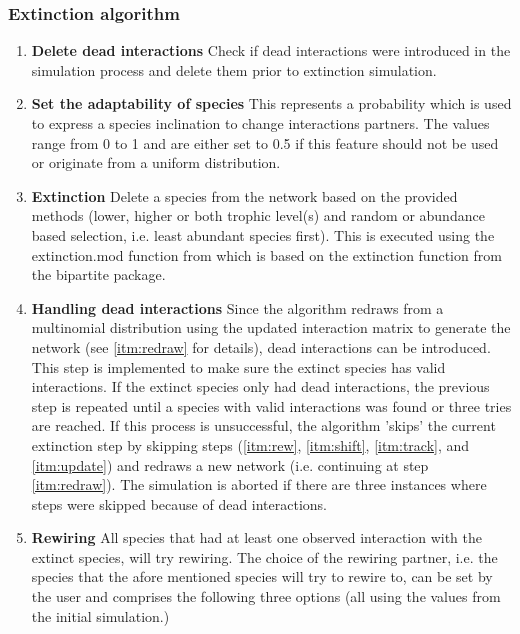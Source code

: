 \documentclass[12pt,a4paper]{article}
\begin{document}
\subsubsection{Extinction algorithm} \label{subsec:extc_alg}
\begin{enumerate} 
	\item \textbf{Delete dead interactions} {\small Check if dead interactions were introduced in the simulation process and delete them prior to extinction simulation.}
	\item \textbf{Set the adaptability of species} {\small This represents a probability which is used to express a species inclination to change interactions partners. The values range from 0 to 1 and are either set to 0.5 if this feature should not be used or originate from a uniform distribution.}
	\item \label{itm:etxc} \textbf{Extinction} {\small Delete a species from the network based on the provided methods (lower, higher or both trophic level(s) and random or abundance based selection, i.e. least abundant species first). This is executed using the extinction.mod function from \citeauthor{vizentin-bugoni2019} which is based on the extinction function from the bipartite package.}
	\item \label{itm:failsafe} \textbf{Handling dead interactions} {\small Since the algorithm redraws from a multinomial distribution using the updated interaction matrix to generate the network (see \ref{itm:redraw} for details), dead interactions can be introduced. This step is implemented to make sure the extinct species has valid interactions. If the extinct species only had dead interactions, the previous step is repeated until a species with valid interactions was found or three tries are reached. If this process is unsuccessful, the algorithm 'skips' the current extinction step by skipping steps (\ref{itm:rew}, \ref{itm:shift}, \ref{itm:track}, and \ref{itm:update}) and redraws a new network (i.e. continuing at step \ref{itm:redraw}). The simulation is aborted if there are three instances where steps were skipped because of dead interactions.}
	\item \label{itm:rew} \textbf{Rewiring} {\small All species that had at least one observed interaction with the extinct species, will try rewiring. The choice of the rewiring partner, i.e. the species that the afore mentioned species will try to rewire to, can be set by the user and comprises the following three options (all using the values from the initial simulation.)}
		\begin{itemize}

\end{itemize}
\end{enumerate}
\end{document}
